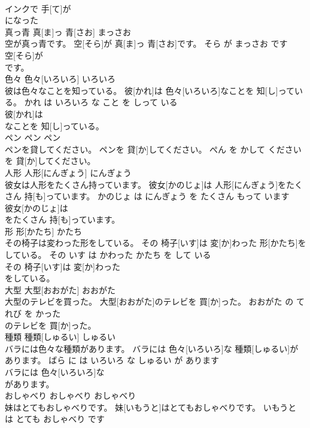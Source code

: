 \documentclass[8pt]{extreport}
\begin{document}
\begin{CJK}{UTF8}{min}
\\	インクで 手[て]が
\\	になった			
\\	真っ青	真[ま]っ 青[さお]	まっさお	
\\	空が真っ青です。	空[そら]が 真[ま]っ 青[さお]です。	そら が まっさお です	
\\	空[そら]が
\\	です。			
\\	色々	色々[いろいろ]	いろいろ	
\\	彼は色々なことを知っている。	彼[かれ]は 色々[いろいろ]なことを 知[し]っている。	かれ は いろいろ な こと を しって いる	
\\	彼[かれ]は
\\	なことを 知[し]っている。			
\\	ペン	ペン	ペン	
\\	ペンを貸してください。	ペンを 貸[か]してください。	ぺん を かして ください	
\\	を 貸[か]してください。			
\\	人形	人形[にんぎょう]	にんぎょう	
\\	彼女は人形をたくさん持っています。	彼女[かのじょ]は 人形[にんぎょう]をたくさん 持[も]っています。	かのじょ は にんぎょう を たくさん もって います	
\\	彼女[かのじょ]は
\\	をたくさん 持[も]っています。			
\\	形	形[かたち]	かたち	
\\	その椅子は変わった形をしている。	その 椅子[いす]は 変[か]わった 形[かたち]をしている。	その いす は かわった かたち を して いる	
\\	その 椅子[いす]は 変[か]わった
\\	をしている。			
\\	大型	大型[おおがた]	おおがた	
\\	大型のテレビを買った。	大型[おおがた]のテレビを 買[か]った。	おおがた の てれび を かった	
\\	のテレビを 買[か]った。			
\\	種類	種類[しゅるい]	しゅるい	
\\	バラには色々な種類があります。	バラには 色々[いろいろ]な 種類[しゅるい]があります。	ばら に は いろいろ な しゅるい が あります	
\\	バラには 色々[いろいろ]な
\\	があります。			
\\	おしゃべり	おしゃべり	おしゃべり	
\\	妹はとてもおしゃべりです。	妹[いもうと]はとてもおしゃべりです。	いもうと は とても おしゃべり です	

\end{CJK}
\end{document}
